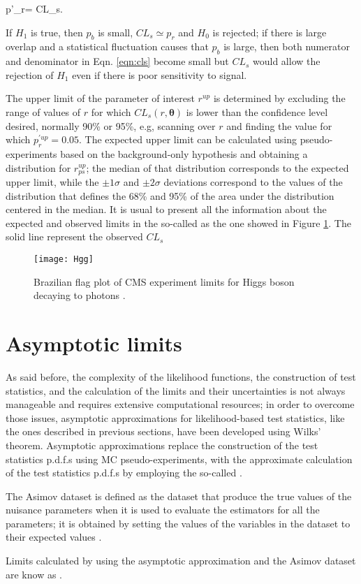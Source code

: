 \beqn
p'_r=  \equiv CL_s.\label{eqn:cls}
\eeqn

If $H_1$ is true, then $p_b$ is small, $CL_s\simeq p_r$ and $H_0$ is rejected; if there is large overlap and a statistical fluctuation causes that $p_b$ is large, then both numerator and denominator in Eqn. \ref{eqn:cls} become small but $CL_s$ would allow the rejection of $H_1$ even if there is poor sensitivity to signal.     

The upper limit of the parameter of interest $r^{up}$ is determined by excluding the range of values of $r$ for which $CL_s(r,\bm{\theta})$ is lower than the confidence level desired, normally 90\% or 95\%, e.g, scanning over $r$ and finding the value for which $p_r^{'up}=0.05$. The expected upper limit can be calculated using pseudo-experiments based on the background-only hypothesis and obtaining a distribution for $r^{up}_{ps}$; the median of that distribution corresponds to the expected upper limit, while the $\pm 1\sigma$ and $\pm2\sigma$ deviations correspond to the values of the distribution that defines the 68\% and 95\% of the area under the distribution centered in the median. It is usual to present all the information about the expected and observed limits in the so-called  as the one showed in Figure \ref{fig:hgg}. The solid line represent the observed $CL_s$  

\begin{figure}[!h]
  \centering
  \texttt{[image: Hgg]}
  \caption[Example of Brazilian flag plot]{ Brazilian flag plot of CMS experiment limits for Higgs boson decaying to photons \cite{hgg}.}\label{fig:hgg}
\end{figure}

\section{Asymptotic limits}

As said before, the complexity of the likelihood functions, the construction of test statistics, and the calculation of the limits and their uncertainties is not always manageable and requires extensive computational resources; in order to overcome those issues, asymptotic approximations for likelihood-based test statistics, like the ones described in previous sections, have been developed \cite{wald,asymptotic} using Wilks' theorem. Asymptotic approximations replace the construction of the test statistics p.d.f.s using MC pseudo-experiments, with the approximate calculation of the test statistics p.d.f.s by employing the so-called .

The Asimov dataset is defined as the dataset that produce the true values of the nuisance parameters when it is used to evaluate the estimators for all the parameters; it is obtained by setting the values of the variables in the dataset to their expected values \cite{asymptotic}.

Limits calculated by using the asymptotic approximation and the Asimov dataset are know as .
